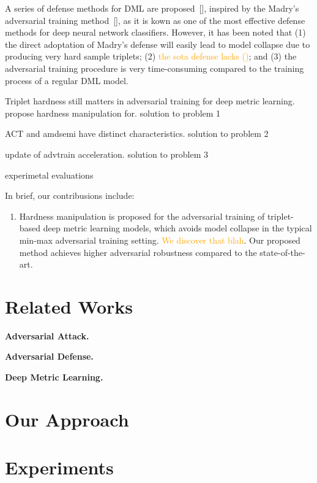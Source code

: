 \documentclass[10pt,twocolumn,letterpaper]{article}
\newcommand{\oo}[1]{\textcolor{orange}{#1}}
\begin{document}
A series of defense methods for DML are proposed~[], inspired by the Madry's
adversarial training method~[], as it is kown as one of the most effective
defense methods for deep neural network classifiers.
%
However, it has been noted that
%
(1) the direct adoptation of Madry's defense will easily lead to model collapse
due to producing very hard sample triplets;
%
(2) \oo{the sota defense lacks ()};
%
and (3) the adversarial training procedure is very time-consuming compared
to the training process of a regular DML model.

Triplet hardness still matters in adversarial training for deep metric
learning.
%
propose hardness manipulation for.
solution to problem 1

ACT and amdsemi have distinct characteristics.
solution to problem 2

update of advtrain acceleration.
solution to problem 3

experimetal evaluations

In brief, our contribusions include:
%
\begin{enumerate}
	\item Hardness manipulation is proposed for the adversarial training
		of triplet-based deep metric learning models, which avoids model
		collapse in the typical min-max adversarial training setting.
		\oo{We discover that blah}.
		Our proposed method achieves higher adversarial robustness compared
		to the state-of-the-art.
\end{enumerate}

\section{Related Works}
\label{sec:2}

\textbf{Adversarial Attack.}

\textbf{Adversarial Defense.}

\textbf{Deep Metric Learning.}
\cite{advrank,advorder,robrank}

\section{Our Approach}
\label{sec:3}

\section{Experiments}
\label{sec:4}
\end{document}
